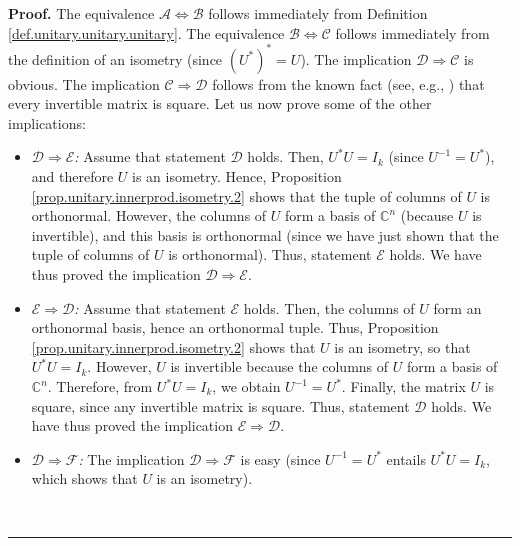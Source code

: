 \documentclass[numbers=enddot,12pt,final,onecolumn,notitlepage]{scrartcl}%
\numberwithin{exer}{subsection}
\theoremstyle{definition}
\newenvironment{proof}[1][Proof]{\noindent\textbf{#1.} }{\ \rule{0.5em}{0.5em}}
\begin{document}
\begin{proof}
The equivalence $\mathcal{A}\Longleftrightarrow\mathcal{B}$ follows
immediately from Definition \ref{def.unitary.unitary.unitary}. The equivalence
$\mathcal{B}\Longleftrightarrow\mathcal{C}$ follows immediately from the
definition of an isometry (since $\left(  U^{\ast}\right)  ^{\ast}=U$). The
implication $\mathcal{D}\Longrightarrow\mathcal{C}$ is obvious. The
implication $\mathcal{C}\Longrightarrow\mathcal{D}$ follows from the known
fact (see, e.g., \cite[Chapter 2, Corollary 3.7]{Treil15}) that every
invertible matrix is square. Let us now prove some of the other implications:

\begin{itemize}
\item $\mathcal{D}\Longrightarrow\mathcal{E}$\textit{:} Assume that statement
$\mathcal{D}$ holds. Then, $U^{\ast}U=I_{k}$ (since $U^{-1}=U^{\ast}$), and
therefore $U$ is an isometry. Hence, Proposition
\ref{prop.unitary.innerprod.isometry.2} shows that the tuple of columns of $U$
is orthonormal. However, the columns of $U$ form a basis of $\mathbb{C}^{n}$
(because $U$ is invertible), and this basis is orthonormal (since we have just
shown that the tuple of columns of $U$ is orthonormal). Thus, statement
$\mathcal{E}$ holds. We have thus proved the implication $\mathcal{D}%
\Longrightarrow\mathcal{E}$.

\item $\mathcal{E}\Longrightarrow\mathcal{D}$\textit{:} Assume that statement
$\mathcal{E}$ holds. Then, the columns of $U$ form an orthonormal basis, hence
an orthonormal tuple. Thus, Proposition
\ref{prop.unitary.innerprod.isometry.2} shows that $U$ is an isometry, so that
$U^{\ast}U=I_{k}$. However, $U$ is invertible because the columns of $U$ form
a basis of $\mathbb{C}^{n}$. Therefore, from $U^{\ast}U=I_{k}$, we obtain
$U^{-1}=U^{\ast}$. Finally, the matrix $U$ is square, since any invertible
matrix is square. Thus, statement $\mathcal{D}$ holds. We have thus proved the
implication $\mathcal{E}\Longrightarrow\mathcal{D}$.

\item $\mathcal{D}\Longrightarrow\mathcal{F}$\textit{:} The implication
$\mathcal{D}\Longrightarrow\mathcal{F}$ is easy (since $U^{-1}=U^{\ast}$
entails $U^{\ast}U=I_{k}$, which shows that $U$ is an isometry).


\end{itemize}
\end{proof}
\end{document}
